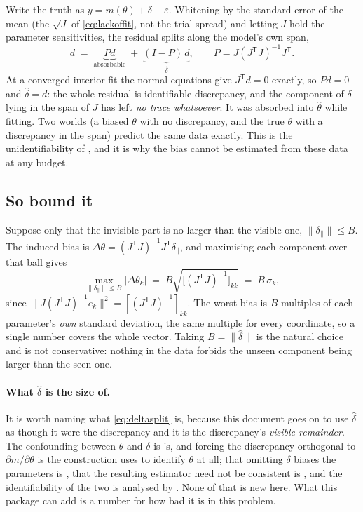 \documentclass[10pt]{article}
\begin{document}
Write the truth as $y = m(\theta) + \delta + \varepsilon$. Whitening by the standard error of
the mean (the $\sqrt{J}$ of \cref{eq:lackoffit}, not the trial spread) and letting $J$
hold the parameter sensitivities, the residual splits along the model's own span,
%
\begin{equation}
d \;=\; \underbrace{P d}_{\text{absorbable}} \;+\; \underbrace{(I-P)\,d}_{\hat\delta},
\qquad P = J (J^{\mathsf T}J)^{-1}J^{\mathsf T}.
\label{eq:deltasplit}
\end{equation}
%
At a converged interior fit the normal equations give $J^{\mathsf T}d = 0$ exactly, so $Pd = 0$
and $\hat\delta = d$: the whole residual is identifiable discrepancy, and the component of
$\delta$ lying in the span of $J$ has left \emph{no trace whatsoever}. It was absorbed into
$\hat\theta$ while fitting. Two worlds (a biased $\theta$ with no discrepancy, and the true
$\theta$ with a discrepancy in the span) predict the same data exactly. This is the
unidentifiability of \citet{kennedy2001bayesian}, and it is why the bias cannot be estimated
from these data at any budget.

\subsection*{So bound it}

Suppose only that the invisible part is no larger than the visible one,
$\lVert\delta_\parallel\rVert \le B$. The induced bias is
$\Delta\theta = (J^{\mathsf T}J)^{-1}J^{\mathsf T}\delta_\parallel$, and maximising each
component over that ball gives
%
\begin{equation}
\max_{\lVert\delta_\parallel\rVert \le B}\lvert\Delta\theta_k\rvert
\;=\; B\sqrt{\big[(J^{\mathsf T}J)^{-1}\big]_{kk}} \;=\; B\,\sigma_k ,
\label{eq:biasbound}
\end{equation}
%
since $\lVert J(J^{\mathsf T}J)^{-1}e_k\rVert^2 = [(J^{\mathsf T}J)^{-1}]_{kk}$. The worst bias
is $B$ multiples of each parameter's \emph{own} standard deviation, the same multiple for every
coordinate, so a single number covers the whole vector. Taking $B = \lVert\hat\delta\rVert$ is
the natural choice and is not conservative: nothing in the data forbids the unseen component
being larger than the seen one.

\paragraph{What $\hat\delta$ is the size of.} It is worth naming what \eqref{eq:deltasplit} is,
because this document goes on to use $\hat\delta$ as though it were the discrepancy and it is the
discrepancy's \emph{visible remainder}. The confounding between $\theta$ and $\delta$ is
\citet{kennedy2001bayesian}'s, and forcing the discrepancy orthogonal to
$\partial m/\partial\theta$ is the construction \citet{plumlee2017bayesian} uses to identify
$\theta$ at all; that omitting $\delta$ biases the parameters is \citet{brynjarsdottir2014learning},
that the resulting estimator need not be consistent is \citet{tuo2015efficient}, and the
identifiability of the two is analysed by \citet{arendt2012quantification}. None of that is new
here. What this package can add is a number for how bad it is in this problem.
\end{document}

